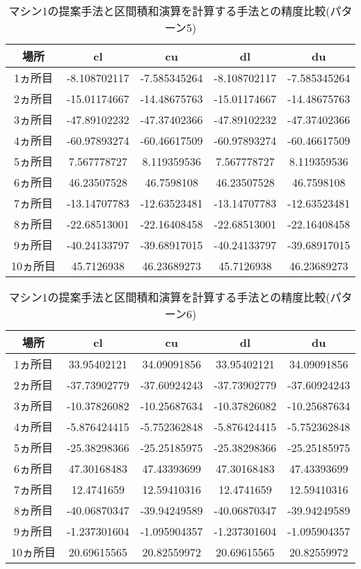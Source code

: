 \documentclass[11pt,a4paper]{jsreport}
\theoremstyle{definition}
\begin{document}
\begin{table}[H]
\centering
\begin{tabular}{|c|c|c|c|c|}
\hline
場所 & cl & cu & dl & du \\ \hline
1ヵ所目 & -8.108702117 & -7.585345264 & -8.108702117 & -7.585345264 \\ \hline
2ヵ所目 & -15.01174667 & -14.48675763 & -15.01174667 & -14.48675763 \\ \hline
3ヵ所目 & -47.89102232 & -47.37402366 & -47.89102232 & -47.37402366 \\ \hline
4ヵ所目 & -60.97893274 & -60.46617509 & -60.97893274 & -60.46617509 \\ \hline
5ヵ所目 & 7.567778727 & 8.119359536 & 7.567778727 & 8.119359536 \\ \hline
6ヵ所目 & 46.23507528 & 46.7598108 & 46.23507528 & 46.7598108 \\ \hline
7ヵ所目 & -13.14707783 & -12.63523481 & -13.14707783 & -12.63523481 \\ \hline
8ヵ所目 & -22.68513001 & -22.16408458 & -22.68513001 & -22.16408458 \\ \hline
9ヵ所目 & -40.24133797 & -39.68917015 & -40.24133797 & -39.68917015 \\ \hline
10ヵ所目 & 45.7126938 & 46.23689273 & 45.7126938 & 46.23689273 \\ \hline
\end{tabular}
\caption{マシン1の提案手法と区間積和演算を計算する手法との精度比較(パターン5)}
\end{table}

\begin{table}[H]
\centering
\begin{tabular}{|c|c|c|c|c|}
\hline
場所 & cl & cu & dl & du \\ \hline
1ヵ所目 & 33.95402121 & 34.09091856 & 33.95402121 & 34.09091856 \\ \hline
2ヵ所目 & -37.73902779 & -37.60924243 & -37.73902779 & -37.60924243 \\ \hline
3ヵ所目 & -10.37826082 & -10.25687634 & -10.37826082 & -10.25687634 \\ \hline
4ヵ所目 & -5.876424415 & -5.752362848 & -5.876424415 & -5.752362848 \\ \hline
5ヵ所目 & -25.38298366 & -25.25185975 & -25.38298366 & -25.25185975 \\ \hline
6ヵ所目 & 47.30168483 & 47.43393699 & 47.30168483 & 47.43393699 \\ \hline
7ヵ所目 & 12.4741659 & 12.59410316 & 12.4741659 & 12.59410316 \\ \hline
8ヵ所目 & -40.06870347 & -39.94249589 & -40.06870347 & -39.94249589 \\ \hline
9ヵ所目 & -1.237301604 & -1.095904357 & -1.237301604 & -1.095904357 \\ \hline
10ヵ所目 & 20.69615565 & 20.82559972 & 20.69615565 & 20.82559972 \\ \hline
\end{tabular}
\caption{マシン1の提案手法と区間積和演算を計算する手法との精度比較(パターン6)}
\end{table}
\end{document}
